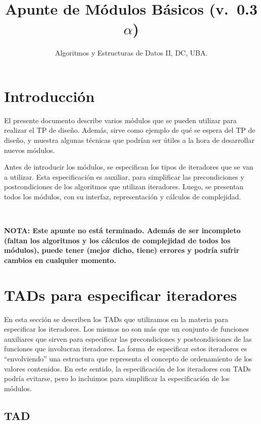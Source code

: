 \documentclass[a4paper,10pt]{article}
\title{Apunte de Módulos Básicos (v.\ 0.3$\alpha$)}
\author{Algoritmos y Estructuras de Datos II, DC, UBA.}
\date{\Cuatrimestre}
\begin{document}
\thispagestyle{empty}
\maketitle
\tableofcontents

\newpage

\section{Introducción}

El presente documento describe varios módulos que se pueden utilizar para realizar el TP de diseño.  Además, sirve como ejemplo de qué se espera del TP de diseño, y muestra algunas técnicas que podrían ser útiles a la hora de desarrollar nuevos módulos.

Antes de introducir los módulos, se especifican los tipos de iteradores que se van a utilizar.  Esta especificación es auxiliar, para simplificar las precondiciones y postcondiciones de los algoritmos que utilizan iteradores.  Luego, se presentan todos los módulos, con su interfaz, representación y cálculos de complejidad.

~

\noindent\textbf{NOTA: Este apunte no está terminado.  Además de ser incompleto (faltan los algoritmos y los cálculos de complejidad de todos los módulos), puede tener (mejor dicho, tiene) errores y podría sufrir cambios en cualquier momento.}

\section{TADs para especificar iteradores}

En esta sección se describen los TADs que utilizamos en la materia para especificar los iteradores.  Los mismos no son más que un conjunto de funciones auxiliares que sirven para especificar las precondiciones y postcondiciones de las funciones que involucran iteradores.  La forma de especificar estos iteradores es ``envolviendo'' una estructura que representa el concepto de ordenamiento de los valores contenidos.  En este sentido, la especificación de los iteradores con TADs podría evitarse, pero lo incluimos para simplificar la especificación de los módulos. 

\subsection{TAD }
\end{document}
